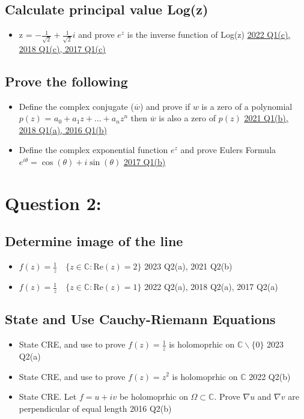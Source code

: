\documentclass[a4paper, 8pt]{extarticle}
\begin{document}
\subsection{Calculate principal value Log(z)}
\begin{itemize}
	\item z = $-\frac{1}{\sqrt{2}} + \frac{1}{\sqrt{2}} i$ and prove $e^z$ is the inverse function of Log(z) \hfill \hyperref[sol:2022Q1c]{\uline{2022 Q1(c), 2018 Q1(c), 2017 Q1(c)}}
\end{itemize}
\subsection{Prove the following}
\begin{itemize}
	\item Define the complex conjugate ($\overline{w}$) and prove if $w$ is a zero of a polynomial $p(z)$ = $a_0 + a_1 z + \ldots + a_n z^n$ then $\overline{w}$ is also a zero of $p(z)$ \hfill \hyperref[sol:2021Q1b]{\uline{2021 Q1(b), 2018 Q1(a), 2016 Q1(b)}}
	\item Define the complex exponential function $e^z$ and prove Eulers Formula $e^{i \theta} = \cos(\theta) + i \sin(\theta)$ \hfill \hyperref[sol:2017Q1b]{\uline{2017 Q1(b)}}
\end{itemize}





\pagebreak


\section{Question 2: }
\subsection{Determine image of the line}
\begin{itemize}
	\item $f(z) = \frac{1}{z} \quad \{z \in \mathbb{C}: \text{Re}(z) = 2\}$ \hfill 2023 Q2(a), 2021 Q2(b)
	\item $f(z) = \frac{1}{z} \quad \{z \in \mathbb{C}: \text{Re}(z) = 1\}$ \hfill 2022 Q2(a), 2018 Q2(a), 2017 Q2(a)
\end{itemize}
\subsection{State and Use Cauchy-Riemann Equations}
\begin{itemize}
	\item State CRE, and use to prove $f(z) = \frac{1}{z}$ is holomoprhic on $\mathbb{C} \backslash \{0\}$ \hfill 2023 Q2(a)
	\item State CRE, and use to prove $f(z) = z^2$ is holomoprhic on $\mathbb{C}$ \hfill 2022 Q2(b)
	\item State CRE. Let $f = u+iv$ be holomoprhic on $\Omega \subset \mathbb{C}$. Prove $\nabla u$ and $\nabla v$ are perpendicular of equal length \hfill 2016 Q2(b)
\end{itemize}
\end{document}
